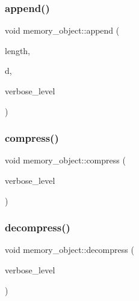 \mbox{\label{classmemory__object_af27e1f0829bc6372b2a2632463bb267f}} 
\subsubsection{\texorpdfstring{append()}{append()}}
{\footnotesize\ttfamily void memory\+\_\+object\+::append (\begin{DoxyParamCaption}\item[{\mbox{\hyperlink{galois_8h_a09fddde158a3a20bd2dcadb609de11dc}{I\+NT}}}]{length,  }\item[{char $\ast$}]{d,  }\item[{\mbox{\hyperlink{galois_8h_a09fddde158a3a20bd2dcadb609de11dc}{I\+NT}}}]{verbose\+\_\+level }\end{DoxyParamCaption})}

\mbox{\label{classmemory__object_a19117ffce9e562d369adac83a51fc997}} 
\subsubsection{\texorpdfstring{compress()}{compress()}}
{\footnotesize\ttfamily void memory\+\_\+object\+::compress (\begin{DoxyParamCaption}\item[{\mbox{\hyperlink{galois_8h_a09fddde158a3a20bd2dcadb609de11dc}{I\+NT}}}]{verbose\+\_\+level }\end{DoxyParamCaption})}

\mbox{\label{classmemory__object_af32137ad9fb4961041d6f83c67c5dea2}} 
\subsubsection{\texorpdfstring{decompress()}{decompress()}}
{\footnotesize\ttfamily void memory\+\_\+object\+::decompress (\begin{DoxyParamCaption}\item[{\mbox{\hyperlink{galois_8h_a09fddde158a3a20bd2dcadb609de11dc}{I\+NT}}}]{verbose\+\_\+level }\end{DoxyParamCaption})}

